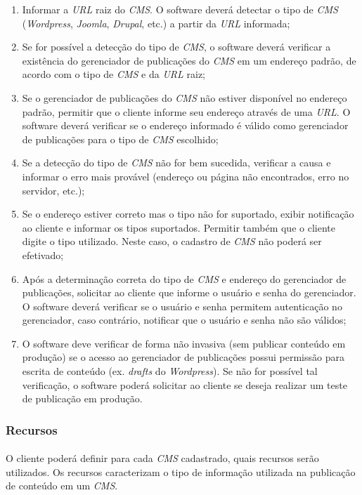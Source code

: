 \documentclass[a4paper,12pt]{article}
\def\cms{\emph{CMS}}
\def\url{\emph{URL}}
\begin{document}
\begin{enumerate}
\item Informar a \url{} raiz do \cms{}. O software deverá detectar o tipo de
\cms{} (\emph{Wordpress}, \emph{Joomla}, \emph{Drupal}, etc.) a partir da
\url{} informada;
\item Se for possível a detecção do tipo de \cms{}, o software deverá verificar
a existência do gerenciador de publicações do \cms{} em um endereço padrão, de
acordo com o tipo de \cms{} e da \url{} raiz;
\item Se o gerenciador de publicações do \cms{} não estiver disponível no
endereço padrão, permitir que o cliente informe seu endereço através de uma
\url{}. O software deverá verificar se o endereço informado é válido como
gerenciador de publicações para o tipo de \cms{} escolhido;
\item Se a detecção do tipo de \cms{} não for bem sucedida, verificar a causa e
informar o erro mais provável (endereço ou página não encontrados, erro no
servidor, etc.);
\item Se o endereço estiver correto mas o tipo não for suportado, exibir
notificação ao cliente e informar os tipos suportados. Permitir também que o
cliente digite o tipo utilizado. Neste caso, o cadastro de \cms{} não poderá
ser efetivado;
\item Após a determinação correta do tipo de \cms{} e endereço do gerenciador
de publicações, solicitar ao cliente que informe o usuário e senha do
gerenciador. O software deverá verificar se o usuário e senha permitem
autenticação no gerenciador, caso contrário, notificar que o usuário e senha
não são válidos;
\item O software deve verificar de forma não invasiva (sem publicar conteúdo em
produção) se o acesso ao gerenciador de publicações possui permissão para
escrita de conteúdo (ex. \emph{drafts} do \emph{Wordpress}). Se não for
possível tal verificação, o software poderá solicitar ao cliente se deseja
realizar um teste de publicação em produção.
\end{enumerate}

\subsubsection{Recursos}

\paragraph{}
O cliente poderá definir para cada \cms{} cadastrado, quais recursos serão
utilizados. Os recursos caracterizam o tipo de informação utilizada na
publicação de conteúdo em um \cms{}.
\end{document}
